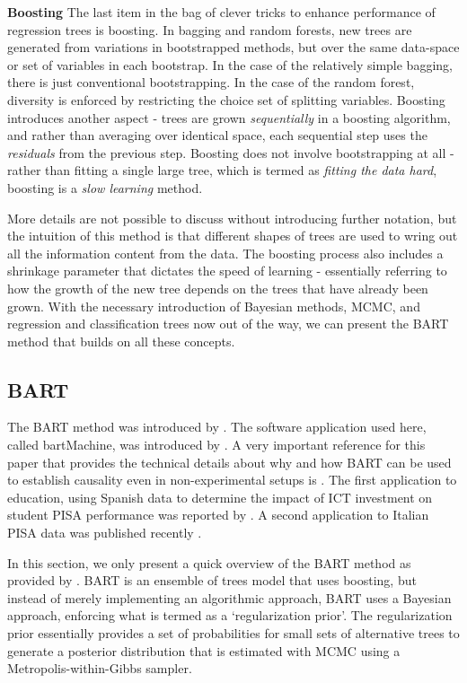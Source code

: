 \documentclass[alpha-refs,fleqn]{wiley-article_p2}
\begin{document}
\textbf{Boosting} The last item in the bag of clever tricks to enhance performance of regression trees is boosting. In bagging and random forests, new  trees are generated from variations in bootstrapped methods, but over the same data-space or set of variables in each bootstrap. In the case of the relatively simple bagging, there is just conventional bootstrapping. In the case of the random forest, diversity is enforced by restricting the choice set of splitting variables. Boosting introduces another aspect - trees are grown {\em{sequentially}} in a boosting algorithm, and rather than averaging over identical space, each sequential step uses the {\em{residuals}} from the previous step. Boosting does not involve bootstrapping at all - rather than fitting a single large tree, which is termed as {\em{fitting the data hard}}, boosting is a {\em{slow learning}} method.

More details are not possible to discuss without introducing further notation, but the intuition of this method is that different shapes of trees are used to wring out all the information content from the data. The boosting process also includes a shrinkage parameter that dictates the speed of learning - essentially referring to how the growth of the new tree depends on the trees that have already been grown. With the necessary introduction of Bayesian methods, MCMC, and regression and classification trees now out of the way, we can present the BART method that builds on all these concepts. 

\subsection{BART}

The BART method was introduced by \cite{Chipman_2010}. The software application used here, called bartMachine, was introduced by \cite{Kapelner_2016}. A very important reference for this paper that provides the technical details about why and how BART can be used to establish causality even in non-experimental setups is \cite{Hill_2011}. The first application to education, using Spanish data to determine the impact of ICT investment on student PISA performance was reported by \cite{Cabras_2016}. A second application to Italian PISA data was published recently \cite{Ferraro_2018}.

In this section, we only present a quick overview of the BART method as provided by \cite{Kapelner_2016}. BART is an ensemble of trees model that uses boosting, but instead of merely implementing an algorithmic approach, BART uses a Bayesian approach, enforcing what is termed as a `regularization prior'. The regularization prior essentially provides a set of probabilities for small sets of alternative trees to generate a posterior distribution that is estimated with MCMC using a Metropolis-within-Gibbs sampler. 
\end{document}
